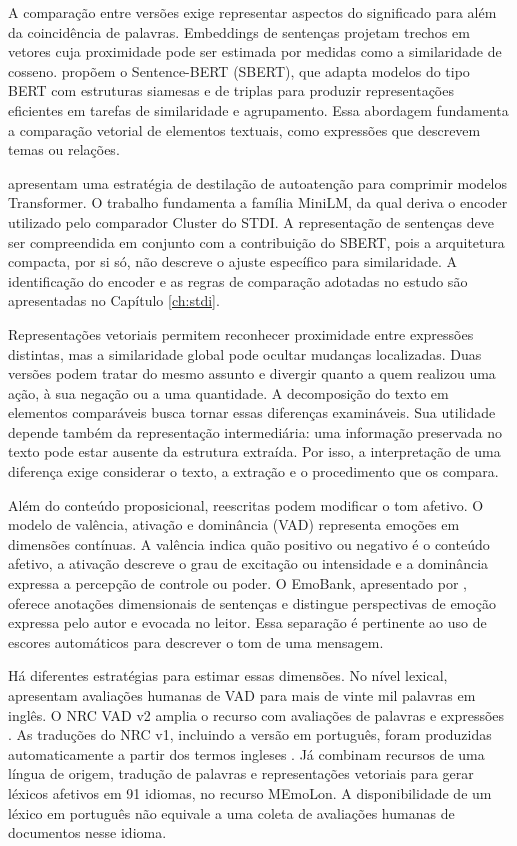 A comparação entre versões exige representar aspectos do significado para além da coincidência de palavras. Embeddings de sentenças projetam trechos em vetores cuja proximidade pode ser estimada por medidas como a similaridade de cosseno.  propõem o Sentence-BERT (SBERT), que adapta modelos do tipo BERT com estruturas siamesas e de triplas para produzir representações eficientes em tarefas de similaridade e agrupamento. Essa abordagem fundamenta a comparação vetorial de elementos textuais, como expressões que descrevem temas ou relações.

 apresentam uma estratégia de destilação de autoatenção para comprimir modelos Transformer. O trabalho fundamenta a família MiniLM, da qual deriva o encoder utilizado pelo comparador Cluster do STDI. A representação de sentenças deve ser compreendida em conjunto com a contribuição do SBERT, pois a arquitetura compacta, por si só, não descreve o ajuste específico para similaridade. A identificação do encoder e as regras de comparação adotadas no estudo são apresentadas no Capítulo \ref{ch:stdi}.

Representações vetoriais permitem reconhecer proximidade entre expressões distintas, mas a similaridade global pode ocultar mudanças localizadas. Duas versões podem tratar do mesmo assunto e divergir quanto a quem realizou uma ação, à sua negação ou a uma quantidade. A decomposição do texto em elementos comparáveis busca tornar essas diferenças examináveis. Sua utilidade depende também da representação intermediária: uma informação preservada no texto pode estar ausente da estrutura extraída. Por isso, a interpretação de uma diferença exige considerar o texto, a extração e o procedimento que os compara.

Além do conteúdo proposicional, reescritas podem modificar o tom afetivo. O modelo de valência, ativação e dominância (VAD) representa emoções em dimensões contínuas. A valência indica quão positivo ou negativo é o conteúdo afetivo, a ativação descreve o grau de excitação ou intensidade e a dominância expressa a percepção de controle ou poder. O EmoBank, apresentado por , oferece anotações dimensionais de sentenças e distingue perspectivas de emoção expressa pelo autor e evocada no leitor. Essa separação é pertinente ao uso de escores automáticos para descrever o tom de uma mensagem.

Há diferentes estratégias para estimar essas dimensões. No nível lexical,  apresentam avaliações humanas de VAD para mais de vinte mil palavras em inglês. O NRC VAD v2 amplia o recurso com avaliações de palavras e expressões \cite{mohammad2025vadv2,mohammad2025breaking}. As traduções do NRC v1, incluindo a versão em português, foram produzidas automaticamente a partir dos termos ingleses \cite{mohammad2018vadresource}. Já  combinam recursos de uma língua de origem, tradução de palavras e representações vetoriais para gerar léxicos afetivos em 91 idiomas, no recurso MEmoLon. A disponibilidade de um léxico em português não equivale a uma coleta de avaliações humanas de documentos nesse idioma.

